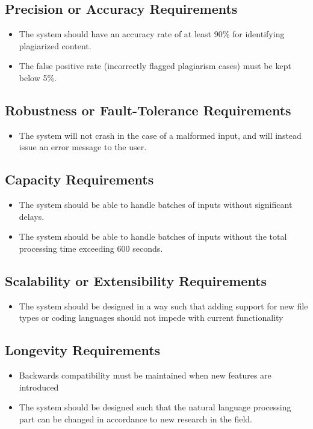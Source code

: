 \documentclass[12pt]{article}
\begin{document}
\subsection{Precision or Accuracy Requirements}
\begin{itemize}
    \item The system should have an accuracy rate of at least 90\% for identifying plagiarized content.
    \item The false positive rate (incorrectly flagged plagiarism cases) must be kept below 5\%.
\end{itemize}
\subsection{Robustness or Fault-Tolerance Requirements}
\begin{itemize}
    \item The system will not crash in the case of a malformed input, and will instead issue an error message to the user.
\end{itemize}
\subsection{Capacity Requirements}
\begin{itemize}
    \item The system should be able to handle batches of inputs without significant delays.
    \item The system should be able to handle batches of inputs without the total processing time exceeding 600 seconds.
\end{itemize}
\subsection{Scalability or Extensibility Requirements}
\begin{itemize}
    \item The system should be designed in a way such that adding support for new file types or coding languages should not impede with current functionality
\end{itemize}
\subsection{Longevity Requirements}
\begin{itemize}
    \item Backwards compatibility must be maintained when new features are introduced
    \item The system should be designed such that the natural language processing part can be changed in accordance to new research in the field.
\end{itemize}
\end{document}
